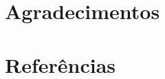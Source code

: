\documentclass[a4paper,12pt]{article}
\begin{document}
\section*{\center Agradecimentos}
\lipsum[1] %



\section*{\center Referências}
\lipsum[1-3] %
\end{document}
